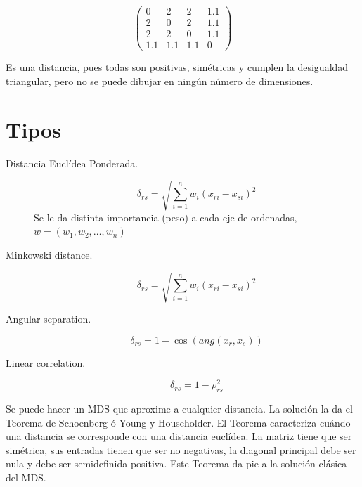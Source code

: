 \begin{equation*}
    \left(\begin{array}{cccc}
        0 & 2 & 2 & 1.1 \\
        2 & 0 & 2 & 1.1 \\
        2 & 2 & 0 & 1.1 \\
        1.1 & 1.1 & 1.1 & 0 
    \end{array}\right)
\end{equation*}

Es una distancia, pues todas son positivas, simétricas y cumplen la desigualdad triangular, pero no se puede dibujar en ningún número de dimensiones.

\section{Tipos}
\begin{description}
    \item [Distancia Euclídea Ponderada.] 
        \begin{equation*}
            \delta_{rs} = \sqrt{\sum_{i=1}^{n}w_i{(x_{ri}-x_{si})}^{2}}
        \end{equation*}
        Se le da distinta importancia (peso) a cada eje de ordenadas, $w = (w_1,w_2,\ldots,w_n)$
    \item [Minkowski distance.] 
        \begin{equation*}
            \delta_{rs} = \sqrt{\sum_{i=1}^{n}w_i{(x_{ri}-x_{si})}^{2}}
        \end{equation*}
    \item [Angular separation.]
        \begin{equation*}
            \delta_{rs} = 1-\cos(ang(x_r,x_s))
        \end{equation*}
    \item [Linear correlation.]
        \begin{equation*}
            \delta_{rs} = 1 - \rho_{rs}^2
        \end{equation*}
\end{description}

Se puede hacer un MDS que aproxime a cualquier distancia. La solución la da el Teorema de Schoenberg ó Young y Householder. El Teorema caracteriza cuándo una distancia se corresponde con una distancia euclídea. La matriz tiene que ser simétrica, sus entradas tienen que ser no negativas, la diagonal principal debe ser nula y debe ser semidefinida positiva. Este Teorema da pie a la solución clásica del MDS.

